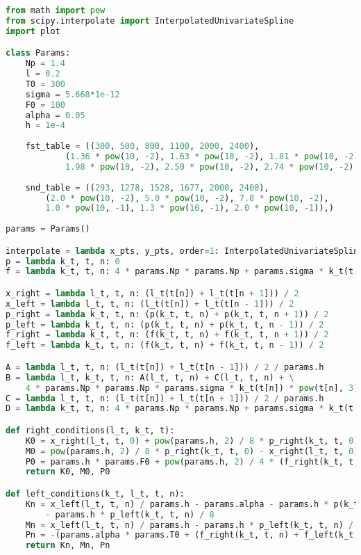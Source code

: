 \begin{lstlisting}[language=python]
from math import pow
from scipy.interpolate import InterpolatedUnivariateSpline
import plot

class Params:
    Np = 1.4
    l = 0.2
    T0 = 300
    sigma = 5.668*1e-12
    F0 = 100
    alpha = 0.05
    h = 1e-4
 
    fst_table = ((300, 500, 800, 1100, 2000, 2400), 
            (1.36 * pow(10, -2), 1.63 * pow(10, -2), 1.81 * pow(10, -2),
            1.98 * pow(10, -2), 2.50 * pow(10, -2), 2.74 * pow(10, -2)))
 
    snd_table = ((293, 1278, 1528, 1677, 2000, 2400),
        (2.0 * pow(10, -2), 5.0 * pow(10, -2), 7.8 * pow(10, -2),
        1.0 * pow(10, -1), 1.3 * pow(10, -1), 2.0 * pow(10, -1)),)
 
params = Params()

interpolate = lambda x_pts, y_pts, order=1: InterpolatedUnivariateSpline(x_pts, y_pts, k=order)
p = lambda k_t, t, n: 0
f = lambda k_t, t, n: 4 * params.Np * params.Np + params.sigma * k_t(t[n]) * (pow(t, 4) - pow(params.T0, 4))

x_right = lambda l_t, t, n: (l_t(t[n]) + l_t(t[n + 1])) / 2
x_left = lambda l_t, t, n: (l_t(t[n]) + l_t(t[n - 1])) / 2
p_right = lambda k_t, t, n: (p(k_t, t, n) + p(k_t, t, n + 1)) / 2
p_left = lambda k_t, t, n: (p(k_t, t, n) + p(k_t, t, n - 1)) / 2
f_right = lambda k_t, t, n: (f(k_t, t, n) + f(k_t, t, n + 1)) / 2
f_left = lambda k_t, t, n: (f(k_t, t, n) + f(k_t, t, n - 1)) / 2

A = lambda l_t, t, n: (l_t(t[n]) + l_t(t[n - 1])) / 2 / params.h
B = lambda l_t, k_t, t, n: A(l_t, t, n) + C(l_t, t, n) + \
    4 * params.Np * params.Np * params.sigma * k_t(t[n]) * pow(t[n], 3) * params.h
C = lambda l_t, t, n: (l_t(t[n]) + l_t(t[n + 1])) / 2 / params.h
D = lambda k_t, t, n: 4 * params.Np * params.Np + params.sigma * k_t(t[n]) * pow(params.T0, 4) * params.h

def right_conditions(l_t, k_t, t):
    K0 = x_right(l_t, t, 0) + pow(params.h, 2) / 8 * p_right(k_t, t, 0) + pow(params.h, 2) / 4 * p(k_t, t, 0)
    M0 = pow(params.h, 2) / 8 * p_right(k_t, t, 0) - x_right(l_t, t, 0)
    P0 = params.h * params.F0 + pow(params.h, 2) / 4 * (f_right(k_t, t, 0) + f_left(k_t, t, 0))
    return K0, M0, P0

def left_conditions(k_t, l_t, t, n):
    Kn = x_left(l_t, t, n) / params.h - params.alpha - params.h * p(k_t, t, n) / 4 \
        - params.h * p_left(k_t, t, n) / 8
    Mn = x_left(l_t, t, n) / params.h - params.h * p_left(k_t, t, n) / 8
    Pn = -(params.alpha * params.T0 + (f_right(k_t, t, n) + f_left(k_t, t, n)) / 4 * params.h)
    return Kn, Mn, Pn


\end{lstlisting}
